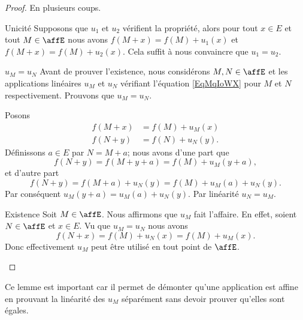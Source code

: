 \begin{proof}
    En plusieurs coups.
    \begin{subproof}
        \item[Unicité]
            Supposons que \( u_1\) et \( u_2\) vérifient la propriété, alors pour tout \( x\in E\) et tout \( M\in \affE\) nous avons \( f(M+x)=f(M)+u_1(x)\) et \( f(M+x)=f(M)+u_2(x)\). Cela suffit à nous convaincre que \( u_1=u_2\).
        \item[\( u_M=u_N\)]
            Avant de prouver l'existence, nous considérons \( M,N\in \affE\) et les applications linéaires \( u_M\) et \( u_N\) vérifiant l'équation \eqref{EqMqIoWX} pour \( M\) et \( N\) respectivement. Prouvons que \( u_M=u_N\).

            Posons
            \begin{subequations}
                \begin{align}
                    f(M+x)&=f(M)+u_M(x)\\
                    f(N+y)&=f(N)+u_N(y).
                \end{align}
            \end{subequations}
            Définissons \( a\in E\) par \( N=M+a\); nous avons d'une part que
            \begin{equation}
                f(N+y)=f(M+y+a)=f(M)+u_M(y+a),
            \end{equation}
            et d'autre part
            \begin{equation}
                f(N+y)=f(M+a)+u_N(y)=f(M)+u_M(a)+u_N(y).
            \end{equation}
            Par conséquent \( u_M(y+a)=u_M(a)+u_N(y)\). Par linéarité \( u_N=u_M\).
        \item[Existence]
            Soit \( M\in \affE\). Nous affirmons que \( u_M\) fait l'affaire. En effet, soient \( N\in \affE\) et \( x\in E\). Vu que \( u_M=u_N\) nous avons
            \begin{equation}
                f(N+x)=f(M)+u_N(x)=f(M)+u_M(x).
            \end{equation}
            Donc effectivement \( u_M\) peut être utilisé en tout point de \( \affE\).
  \end{subproof}
\end{proof}
Ce lemme est important car il permet de démonter qu'une application est affine en prouvant la linéarité des \( u_M\) séparément sans devoir prouver qu'elles sont égales.

